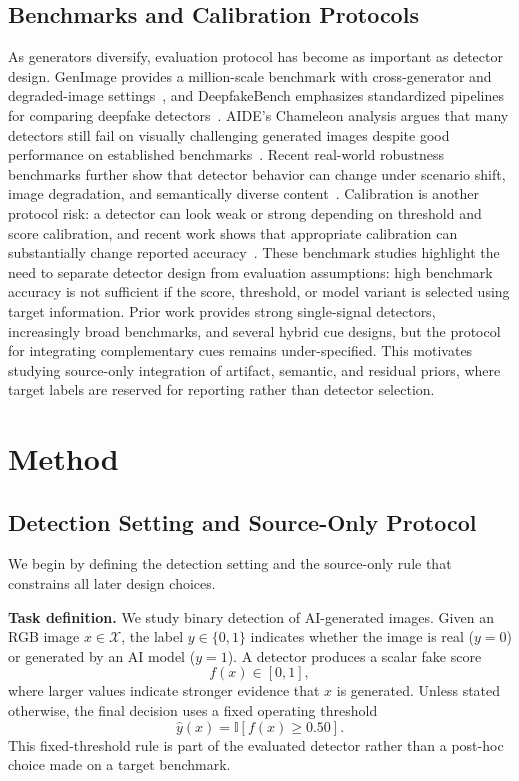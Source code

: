 \documentclass[lettersize,journal]{IEEEtran}
\begin{document}
\subsection{Benchmarks and Calibration Protocols}
As generators diversify, evaluation protocol has become as important as detector design. GenImage provides a million-scale benchmark with cross-generator and degraded-image settings~\cite{zhu2023genimage}, and DeepfakeBench emphasizes standardized pipelines for comparing deepfake detectors~\cite{yan2023deepfakebench}. AIDE's Chameleon analysis argues that many detectors still fail on visually challenging generated images despite good performance on established benchmarks~\cite{yan2025aide}. Recent real-world robustness benchmarks further show that detector behavior can change under scenario shift, image degradation, and semantically diverse content~\cite{li2025rrdataset}. Calibration is another protocol risk: a detector can look weak or strong depending on threshold and score calibration, and recent work shows that appropriate calibration can substantially change reported accuracy~\cite{yang2026calibrated}. These benchmark studies highlight the need to separate detector design from evaluation assumptions: high benchmark accuracy is not sufficient if the score, threshold, or model variant is selected using target information. Prior work provides strong single-signal detectors, increasingly broad benchmarks, and several hybrid cue designs, but the protocol for integrating complementary cues remains under-specified. This motivates studying source-only integration of artifact, semantic, and residual priors, where target labels are reserved for reporting rather than detector selection.

\section{Method}
\label{sec:method}

\subsection{Detection Setting and Source-Only Protocol}
\label{sec:problem_formulation}

We begin by defining the detection setting and the source-only rule that constrains all later design choices.

\textbf{Task definition.}
We study binary detection of AI-generated images. Given an RGB image $x \in \mathcal{X}$, the label $y \in \{0,1\}$ indicates whether the image is real ($y=0$) or generated by an AI model ($y=1$). A detector produces a scalar fake score
\begin{equation}
    f(x) \in [0,1],
\end{equation}
where larger values indicate stronger evidence that $x$ is generated. Unless stated otherwise, the final decision uses a fixed operating threshold
\begin{equation}
    \hat{y}(x) = \mathbb{I}\left[f(x) \geq 0.50\right].
\end{equation}
This fixed-threshold rule is part of the evaluated detector rather than a post-hoc choice made on a target benchmark.
\end{document}
